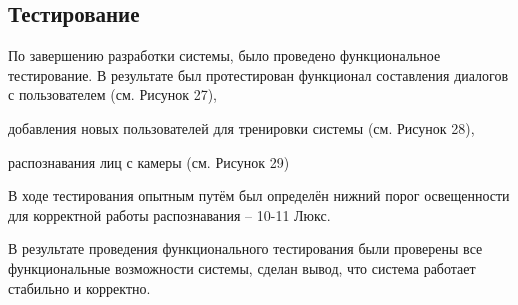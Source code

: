 \subsection{Тестирование}

По завершению разработки системы, было проведено функциональное тестирование.
В результате был протестирован функционал составления диалогов с пользователем
(см. Рисунок 27),


добавления новых пользователей для тренировки системы (см. Рисунок 28),


распознавания лиц с камеры (см. Рисунок 29)


В ходе тестирования опытным путём был определён нижний порог освещенности для
корректной работы распознавания -- 10-11 Люкс.

В результате проведения функционального тестирования были проверены все
функциональные возможности системы, сделан вывод, что система работает
стабильно и корректно.
